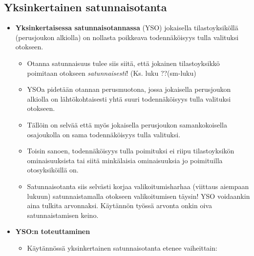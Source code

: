 \documentclass[
]{book}
\providecommand{\tightlist}{%
  \setlength{\itemsep}{0pt}\setlength{\parskip}{0pt}}
\begin{document}
\hypertarget{yksinkertainen-satunnaisotanta}{%
\subsection{Yksinkertainen satunnaisotanta}\label{yksinkertainen-satunnaisotanta}}

\begin{itemize}
\tightlist
\item
  \textbf{Yksinkertaisessa satunnaisotannassa} (YSO) jokaisella tilastoyksiköllä (perusjoukon alkiolla) on nollasta poikkeava todennäköisyys tulla valituksi otokseen.

  \begin{itemize}
  \tightlist
  \item
    Otanna satunnaisuus tulee siis siitä, että jokainen tilastoyksikkö poimitaan otokseen \textit{satunnaisesti}! (Ks. luku ??(sm-luku)
  \item
    YSOa pidetään otannan perusmuotona, jossa jokaisella perusjoukon alkiolla on lähtökohtaisesti yhtä suuri todennäköisyys tulla valituksi otokseen.
  \item
    Tällöin on selvää että myös jokaisella perusjoukon samankokoisella osajoukolla on sama todennäköisyys tulla valituksi.
  \item
    Toisin sanoen, todennäköisyys tulla poimituksi ei riipu tilastoyksikön ominaisuuksista tai siitä minkälaisia ominaisuuksia jo poimituilla otosyksiköillä on.
  \item
    Satunnaisotanta siis selvästi korjaa valikoitumisharhaa (viittaus aiempaan lukuun) satunnaistamalla otokseen valikoitumisen täysin! YSO voidaankin aina tulkita arvonnaksi. Käytännön työssä arvonta onkin oiva satunnaistamisen keino.
  \end{itemize}
\item
  \textbf{YSO:n toteuttaminen}

  \begin{itemize}
  \tightlist
  \item
    Käytännössä yksinkertainen satunnaisotanta etenee vaiheittain:


\end{itemize}
\end{itemize}
\end{document}

